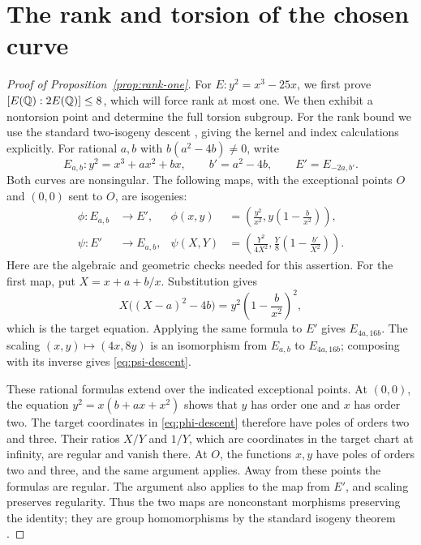 \section{The rank and torsion of the chosen curve}\label{app:rank-one}

\begin{proof}[Proof of Proposition~\ref{prop:rank-one}]
For \(E:y^2=x^3-25x\), we first prove \([E(\mathbb Q):2E(\mathbb Q)]\le8\), which will force
rank at most one.  We then exhibit a nontorsion point and determine
the full torsion subgroup.  For the rank bound we use the standard
two-isogeny descent \cite[Chapter~III, Example~4.5, and
Chapter~X, Section~4, Example~4.8 and Proposition~4.9]{silverman}, giving the kernel and index
calculations explicitly.  For rational
\(a,b\) with \(b(a^2-4b)\ne0\), write
\[
 E_{a,b}:y^2=x^3+ax^2+bx,\qquad
 b'=a^2-4b,\qquad E'=E_{-2a,b'}.
\]
Both curves are nonsingular.  The following maps, with the exceptional
points \(O\) and \((0,0)\) sent to \(O\), are isogenies:
\begin{align}
 \phi:E_{a,b}&\longrightarrow E',&
 \phi(x,y)&=\left(\frac{y^2}{x^2},
                  y\left(1-\frac b{x^2}\right)\right),
 \label{eq:phi-descent}\\
 \psi:E'&\longrightarrow E_{a,b},&
 \psi(X,Y)&=\left(\frac{Y^2}{4X^2},
                  \frac Y8\left(1-\frac{b'}{X^2}\right)\right).
 \label{eq:psi-descent}
\end{align}
Here are the algebraic and geometric checks needed for this assertion.
For the first map, put \(X=x+a+b/x\).  Substitution gives
\[
 X\bigl((X-a)^2-4b\bigr)
     =y^2\left(1-\frac b{x^2}\right)^2,
\]
which is the target equation.  Applying the same formula to \(E'\)
gives \(E_{4a,16b}\).  The scaling \((x,y)\mapsto(4x,8y)\)
is an isomorphism from \(E_{a,b}\) to \(E_{4a,16b}\);
composing with its inverse gives
\eqref{eq:psi-descent}.

These rational formulas extend over the indicated exceptional points.
At \((0,0)\), the equation
\(y^2=x(b+ax+x^2)\) shows that \(y\) has order one and \(x\)
has order two.  The target coordinates in \eqref{eq:phi-descent}
therefore have poles of orders two and three.  Their ratios \(X/Y\)
and \(1/Y\), which are coordinates in the target chart at infinity,
are regular and vanish there.  At \(O\), the functions \(x,y\)
have poles of orders two and three, and the same argument applies.
Away from these points the formulas are regular.  The argument also
applies to the map from \(E'\), and scaling preserves regularity.
Thus the two maps are nonconstant morphisms preserving the identity;
they are group homomorphisms by the standard isogeny theorem
\cite[Chapter~III, Theorem~4.8]{silverman}.


\end{proof}
